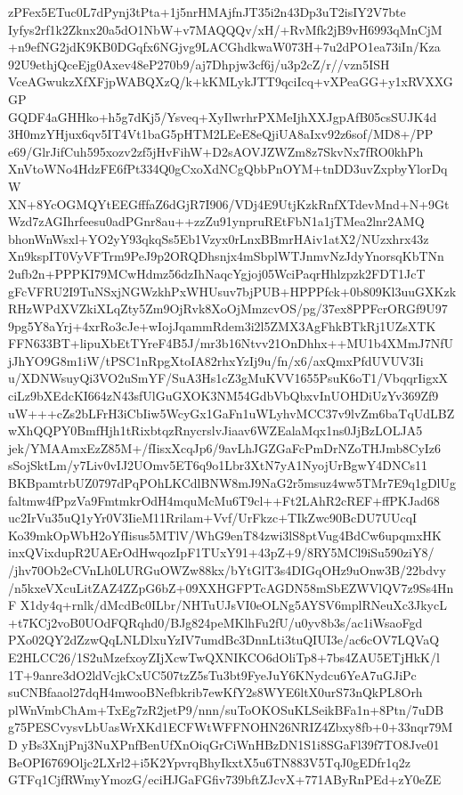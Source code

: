 {{zPFex5ETuc0L7dPynj3tPta+1j5nrHMAjfnJT35i2n43Dp3uT2isIY2V7bte
Iyfys2rf1k2Zknx20a5dO1NbW+v7MAQQQv/xH/+RvMfk2jB9vH6993qMnCjM
+n9efNG2jdK9KB0DGqfx6NGjvg9LACGhdkwaW073H+7u2dPO1ea73iIn/Kza
92U9ethjQceEjg0Axev48eP270b9/aj7Dhpjw3cf6j/u3p2cZ/r//vzn5ISH
VceAGwukzXfXFjpWABQXzQ/k+kKMLykJTT9qciIcq+vXPeaGG+y1xRVXXGGP
GQDF4aGHHko+h5g7dKj5/Ysveq+XyIlwrhrPXMeIjhXXJgpAfB05csSUJK4d
3H0mzYHjux6qv5IT4Vt1baG5pHTM2LEeE8eQjiUA8aIxv92z6sof/MD8+/PP
e69/GlrJifCuh595xozv2zf5jHvFihW+D2sAOVJZWZm8z7SkvNx7fRO0khPh
XnVtoWNo4HdzFE6fPt334Q0gCxoXdNCgQbbPnOYM+tnDD3uvZxpbyYlorDqW
XN+8YcOGMQYtEEGfffaZ6dGjR7I906/VDj4E9UtjKzkRnfXTdevMnd+N+9Gt
Wzd7zAGIhrfeesu0adPGnr8au++zzZu91ynpruREtFbN1a1jTMea2lnr2AMQ
bhonWnWsxl+YO2yY93qkqSs5Eb1Vzyx0rLnxBBmrHAiv1atX2/NUzxhrx43z
Xn9kspIT0VyVFTrm9PeJ9p2ORQDhsnjx4mSbplWTJnmvNzJdyYnorsqKbTNn
2ufb2n+PPPKI79MCwHdmz56dzIhNaqcYgjoj05WciPaqrHhlzpzk2FDT1JcT
gFcVFRU2I9TuNSxjNGWzkhPxWHUsuv7bjPUB+HPPPfck+0b809Kl3uuGXKzk
RHzWPdXVZkiXLqZty5Zm9OjRvk8XoOjMmzcvOS/pg/37ex8PPFcrORGf9U97
9pg5Y8aYrj+4xrRo3cJe+wIojJqammRdem3i2l5ZMX3AgFhkBTkRj1UZsXTK
FFN633BT+lipuXbEtTYreF4B5J/mr3b16Ntvv21OnDhhx++MU1b4XMmJ7NfU
jJhYO9G8m1iW/tPSC1nRpgXtoIA82rhxYzIj9u/fn/x6/axQmxPfdUVUV3Ii
u/XDNWsuyQi3VO2uSmYF/SuA3Hs1cZ3gMuKVV1655PsuK6oT1/VbqqrIigxX
ciLz9bXEdcKI664zN43sfUlGuGXOK3NM54GdbVbQbxvInUOHDiUzYv369Zf9
uW+++cZs2bLFrH3iCbIiw5WcyGx1GaFn1uWLyhvMCC37v9lvZm6baTqUdLBZ
wXhQQPY0BmfHjh1tRixbtqzRnycrslvJiaav6WZEalaMqx1ns0JjBzLOLJA5
jek/YMAAmxEzZ85M+/fIisxXcqJp6/9avLhJGZGaFcPmDrNZoTHJmb8CyIz6
sSojSktLm/y7Liv0vIJ2UOmv5ET6q9o1Lbr3XtN7yA1NyojUrBgwY4DNCs11
BKBpamtrbUZ0797dPqPOhLKCdlBNW8mJ9NaG2r5msuz4ww5TMr7E9q1gDlUg
faltmw4fPpzVa9FmtmkrOdH4mquMcMu6T9cl++Ft2LAhR2cREF+ffPKJad68
uc2IrVu35uQ1yYr0V3IieM11Rrilam+Vvf/UrFkzc+TIkZwc90BcDU7UUcqI
Ko39mkOpWbH2oYfIisus5MTlV/WhG9enT84zwi3lS8ptVug4BdCw6upqmxHK
inxQVixdupR2UAErOdHwqozIpF1TUxY91+43pZ+9/8RY5MCl9iSu590ziY8/
/jhv70Ob2eCVnLh0LURGuOWZw88kx/bYtGlT3s4DIGqOHz9uOnw3B/22bdvy
/n5kxeVXcuLitZAZ4ZZpG6bZ+09XXHGFPTcAGDN58mSbEZWVlQV7z9Ss4HnF
X1dy4q+rnlk/dMcdBc0ILbr/NHTuUJsVI0eOLNg5AYSV6mplRNeuXc3JkycL
+t7KCj2voB0UOdFQRqhd0/BJg824peMKlhFu2fU/u0yv8b3s/ac1iWsaoFgd
PXo02QY2dZzwQqLNLDlxuYzIV7umdBc3DnnLti3tuQIUI3e/ac6cOV7LQVaQ
E2HLCC26/1S2uMzefxoyZIjXcwTwQXNIKCO6dOliTp8+7bs4ZAU5ETjHkK/l
1T+9anre3dO2ldVcjkCxUC507tzZ5sTu3bt9FyeJuY6KNydcu6YeA7uGJiPc
suCNBfaaol27dqH4mwooBNefbkrib7ewKfY2s8WYE6ltX0urS73nQkPL8Orh
plWnVmbChAm+TxEg7zR2jetP9/nnn/suToOKOSuKLSeikBFa1n+8Ptn/7uDB
g75PESCvysvLbUasWrXKd1ECFWtWFFNOHN26NRIZ4Zbxy8fb+0+33nqr79MD
yBs3XnjPnj3NuXPnfBenUfXnOiqGrCiWnHBzDN1S1i8SGaFl39f7TO8Jve01
BeOPI6769Oljc2LXrl2+i5K2YpvrqBhyIkxtX5u6TN883V5TqJ0gEDfr1q2z
GTFq1CjfRWmyYmozG/eciHJGaFGfiv739bftZJcvX+771AByRnPEd+zY0eZE
}}

